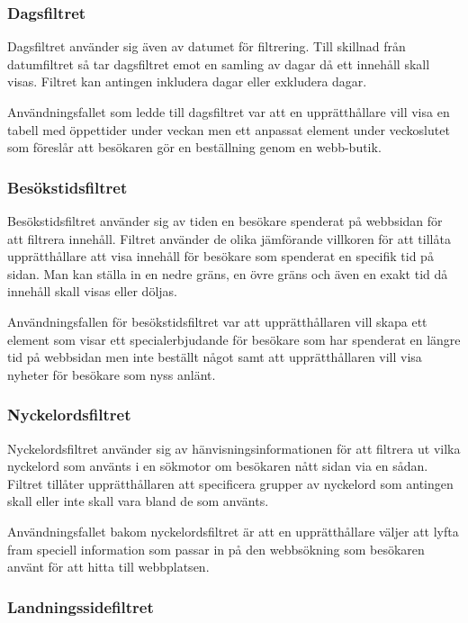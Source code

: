 \subsubsection{Dagsfiltret}

Dagsfiltret använder sig även av datumet för filtrering. Till skillnad från datumfiltret så tar dagsfiltret emot en samling av dagar då ett innehåll skall visas. Filtret kan antingen inkludera dagar eller exkludera dagar.

Användningsfallet som ledde till dagsfiltret var att en upprätthållare vill visa en tabell med öppettider under veckan men ett anpassat element under veckoslutet som föreslår att besökaren gör en beställning genom en webb-butik.

\subsubsection{Besökstidsfiltret}

Besökstidsfiltret använder sig av tiden en besökare spenderat på webbsidan för att filtrera innehåll. Filtret använder de olika jämförande villkoren för att tillåta upprätthållare att visa innehåll för besökare som spenderat en specifik tid på sidan. Man kan ställa in en nedre gräns, en övre gräns och även en exakt tid då innehåll skall visas eller döljas.

Användningsfallen för besökstidsfiltret var att upprätthållaren vill skapa ett element som visar ett specialerbjudande för besökare som har spenderat en längre tid på webbsidan men inte beställt något samt att upprätthållaren vill visa nyheter för besökare som nyss anlänt.

\subsubsection{Nyckelordsfiltret}

Nyckelordsfiltret använder sig av hänvisningsinformationen för att filtrera ut vilka nyckelord som använts i en sökmotor om besökaren nått sidan via en sådan. Filtret tillåter upprätthållaren att specificera grupper av nyckelord som antingen skall eller inte skall vara bland de som använts.

Användningsfallet bakom nyckelordsfiltret är att en upprätthållare väljer att lyfta fram speciell information som passar in på den webbsökning som besökaren använt för att hitta till webbplatsen.

\subsubsection{Landningssidefiltret}

